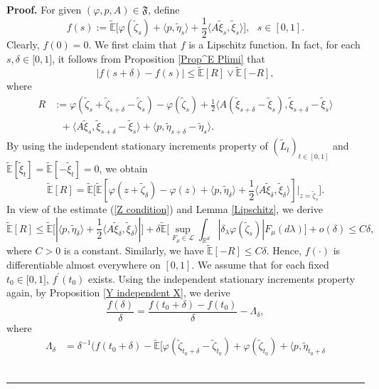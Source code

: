 \documentclass[a4paper,oneside,10pt]{article}%
\newenvironment{proof}[1][Proof]{\noindent \textbf{#1.} }{\  \rule{0.5em}{0.5em}}
\numberwithin{equation}{section}
\begin{document}
\begin{proof}
For given $(\varphi,p,A)\in \mathfrak{F}$, define
\[
f(s):=\mathbb{\tilde{E}}\big[\varphi(\tilde{\zeta}_{s})+\langle p,\tilde{\eta}
_{s}\rangle+\frac{1}{2}\langle A\tilde{\xi}_{s},\tilde{\xi}_{s}\rangle \big],
\text{ \ }s\in[0,1].
\]
Clearly, $f(0)=0$. We first claim that $f$ is a Lipschitz function. In fact,
for each $s,\delta \in \lbrack0,1]$, it follows from Proposition
\ref{Prop^E Plimi} that
\[
|f(s+\delta)-f(s)|\leq \mathbb{\tilde{E}}[R]\vee \mathbb{\tilde{E}}[-R],
\]
where%
\begin{align*}
R  &  :=\varphi(\tilde{\zeta}_{s}+\tilde{\zeta}_{s+\delta}-\tilde{\zeta}
_{s})-\varphi(\tilde{\zeta}_{s})+\frac{1}{2}\langle A(\tilde{\xi}_{s+\delta
}-\tilde{\xi}_{s}),\tilde{\xi}_{s+\delta}-\tilde{\xi}_{s}\rangle \\
&  \text{ \  \ }+\langle A\tilde{\xi}_{s},\tilde{\xi}_{s+\delta}-\tilde{\xi}
_{s}\rangle+\langle p,\tilde{\eta}_{s+\delta}-\tilde{\eta}_{s}\rangle.
\end{align*}
By using the independent stationary increments property of $(\tilde{L}
_{t})_{t\in[0,1]}$ and $\mathbb{\tilde{E}}[\tilde{\xi}_{t}]=\mathbb{\tilde{E}%
}[-\tilde{\xi}_{t}]=0$, we obtain
\[
\mathbb{\tilde{E}}[R]=\mathbb{\tilde{E}}\big[\mathbb{\tilde{E}}[\varphi
(z+\tilde{\zeta} _{\delta})-\varphi(z)+\langle p,\tilde{\eta}_{\delta}%
\rangle+\frac{1}{2} \langle A\tilde{\xi}_{\delta},\tilde{\xi}_{\delta}%
\rangle]|_{z=\tilde{\zeta}_{s}}\big].
\]
In view of the estimate (\ref{Z condition}) and Lemma \ref{Lipschitz}, we
derive
\[
\mathbb{\tilde{E}}[R]\leq \mathbb{\tilde{E}}\big[|\langle p,\tilde{\eta
}_{\delta}\rangle+\frac{1}{2}\langle A\tilde{\xi}_{\delta},\tilde{\xi}
_{\delta}\rangle|\big]+\delta \mathbb{\tilde{E}}\Big[\sup \limits_{F_{\mu}%
\in \mathcal{L}}\int_{\mathbb{R}^{d}}|\delta_{\lambda}\varphi(\tilde{\zeta}
_{s})|F_{\mu}(d\lambda)\Big]+o(\delta)\leq C\delta,
\]
where $C>0$ is a constant. Similarly, we have $\mathbb{\tilde{E}}[-R]\leq
C\delta$. Hence, $f(\cdot)$ is differentiable almost everywhere on $[0,1]$. We
assume that for each fixed $t_{0}\in \lbrack0,1]$, $f^{\prime}(t_{0})$ exists.
Using the independent stationary increments property again, by Proposition
\ref{Y independent X}, we derive
\[
\frac{f(\delta)}{\delta}=\frac{f(t_{0}+\delta)-f(t_{0})}{\delta}
-\Lambda_{\delta},
\]
where
\begin{align*}
\Lambda_{\delta}  &  =\delta^{-1}\Big(f(t_{0}+\delta)-\mathbb{\tilde{E}}
\big[ \varphi(\tilde{\zeta}_{t_{0}+\delta}-\tilde{\zeta}_{t_{0}}%
)+\varphi(\tilde{ \zeta}_{t_{0}})+\langle p,\tilde{\eta}_{t_{0}+\delta}%

\end{align*}
\end{proof}
\end{document}
